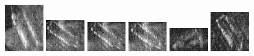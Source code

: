 \begin{figure}
    \includegraphics[width=0.15\textwidth]{chapters/images/dataset/all-class-images/bottle/bottle-316.jpg}
    \includegraphics[width=0.15\textwidth]{chapters/images/dataset/all-class-images/bottle/bottle-110.jpg}
    \includegraphics[width=0.15\textwidth]{chapters/images/dataset/all-class-images/bottle/bottle-104.jpg}
    \includegraphics[width=0.15\textwidth]{chapters/images/dataset/all-class-images/bottle/bottle-65.jpg}
    \includegraphics[width=0.15\textwidth]{chapters/images/dataset/all-class-images/bottle/bottle-56.jpg}
    \includegraphics[width=0.15\textwidth]{chapters/images/dataset/all-class-images/bottle/bottle-183.jpg}
    

\end{figure}
